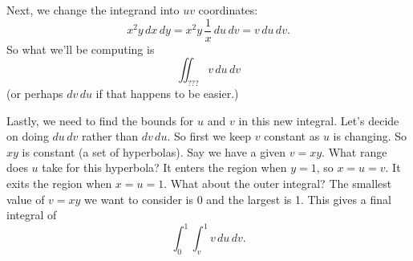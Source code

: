 Next, we change the integrand into $uv$ coordinates:
\[ x^2y\,dx\,dy = x^2y\,\frac 1x\,du\,dv = v\,du\,dv. \]
So what we'll be computing is
\[ \iint_{???} v\,du\,dv \]
(or perhaps $dv\,du$ if that happens to be easier.)

Lastly, we need to find the bounds for $u$ and $v$ in this new integral. Let's decide on doing $du\,dv$ rather than $dv\,du$. So first we keep $v$ constant as $u$ is changing. So $xy$ is constant (a set of hyperbolas). Say we have a given $v=xy$. What range does $u$ take for this hyperbola? It enters the region when $y=1$, so $x=u=v$. It exits the region when $x=u=1$. What about the outer integral? The smallest value of $v=xy$ we want to consider is 0 and the largest is 1. This gives a final integral of
\[ \int_0^1 \int_v^1 v\,du\,dv .\]
\eex
